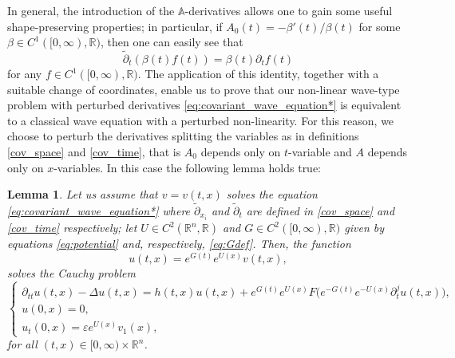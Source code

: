 \documentclass[11pt,reqno]{amsart}
\newtheorem{lemma}{Lemma}
\theoremstyle{definition}
\numberwithin{equation}{section}
\newcommand{\R}{\mathbb{R}}
\newcommand{\A}{\mathbb{A}}
\begin{document}
In general, the introduction of the $\A$-derivatives allows one to gain some useful shape-preserving properties; in particular, if $A_0(t)=-\beta'(t)/\beta(t)$ for some $\beta\in C^1([0,\infty),\R)$, then one can easily see that
%
\[\tilde\partial_t (\beta(t)f(t))=\beta(t)\partial_t f(t)\]
%
for any $f\in C^1([0,\infty),\R).$
%
The application of this identity, together with a suitable change of coordinates, enable us to prove that our non-linear wave-type problem with perturbed derivatives \eqref{eq:covariant_wave_equation*} is equivalent to a classical wave equation with a perturbed non-linearity. 
For this reason, we choose to perturb the derivatives splitting the variables as in definitions \eqref{cov_space} and \eqref{cov_time}, that is $A_0$ depends only on $t$-variable and $A$ depends only on $x$-variables. In this case the following lemma holds true:
%
\begin{lemma}
\label{lem:change_of_coordinates}
Let us assume that $v=v(t,x)$ solves the equation \eqref{eq:covariant_wave_equation*}
where  $\tilde\partial_{x_i}$ and $\tilde\partial_t$ are defined in \eqref{cov_space}  and \eqref{cov_time} respectively; let $U\in C^2(\R^n,\R)$ and $G\in C^2([0,\infty),\R)$ given by equations \eqref{eq:potential} and, respectively, \eqref{eq:Gdef}. Then, the function 
%
\begin{equation*}
u(t,x)=e^{G(t)} e^{U(x)} v(t,x),
\end{equation*}
solves the Cauchy problem
\begin{equation}
\begin{cases}
\label{eq:wave_equation*}
\partial_{tt}u(t,x)-\Delta u(t,x)= h(t,x)u(t,x)+e^{G(t)} e^{U(x)} F\Big(e^{-G(t)} e^{-U(x)}\partial_t^j u(t,x)\Big),&\\
u(0,x)=0,&\\
u_t(0,x)=\varepsilon e^{U(x)} v_1(x),&
\end{cases}
\end{equation}
%
for all $(t,x)\in [0,\infty)\times \R^n$.
\end{lemma}
%
\end{document}
